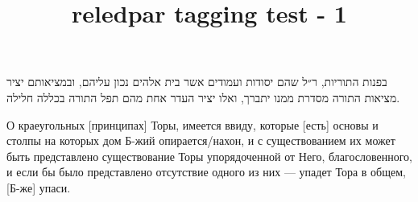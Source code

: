 \documentclass{book}
\title{reledpar tagging test - 1}
\begin{document}
\begin{pairs}

\begin{Rightside}
\begin{RTL}
\begin{hebrew}
\beginnumbering
\pstart
{}
\pend
\pstart
בפנות התוריות, ר״ל שהם יסודות ועמודים אשר בית אלהים נכון עליהם, ובמציאותם יציר מציאות התורה מסדרת ממנו יתברך, ואלו יציר העדר אחת מהם תפל התורה בכללה חלילה.
\pend
\endnumbering
\end{hebrew}
\end{RTL}
\end{Rightside}




\begin{Leftside}
\begin{russian}
\beginnumbering
\pstart
{}
\pend
\pstart
О краеугольных [принципах] Торы, имеется ввиду, которые [есть] основы и столпы на которых дом Б-жий опирается/нахон, и с существованием их может быть представлено существование Торы упорядоченной от Него, благословенного, и если бы было представлено отсутствие одного из них — упадет Тора в общем, [Б-же] упаси.
\pend
\endnumbering
\end{russian}
\end{Leftside}

\end{pairs}
\Columns
\end{document}

